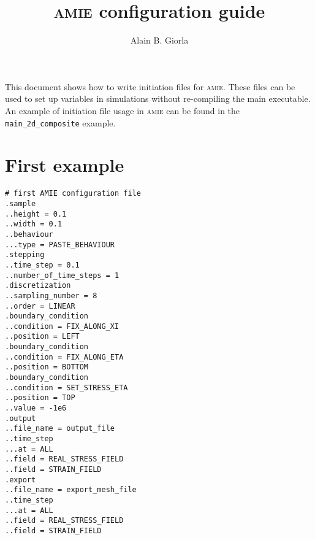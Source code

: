 \documentclass[10pt]{article}
\newcommand{\amie}{\textsc{amie}\xspace}
\begin{document}
\title{\amie configuration guide}
\author{Alain B. Giorla}

\maketitle

This document shows how to write initiation files for \amie. These files can be used to set up variables in simulations without re-compiling the main executable. An example of initiation file usage in \amie can be found in the \verb+main_2d_composite+ example.

\tableofcontents

\section{First example}

\verb+# first AMIE configuration file+\\
\verb+.sample+\\
\verb+..height = 0.1+\\
\verb+..width = 0.1+\\
\verb+..behaviour+\\
\verb+...type = PASTE_BEHAVIOUR+\\
\verb+.stepping+\\
\verb+..time_step = 0.1+\\
\verb+..number_of_time_steps = 1+\\
\verb+.discretization+\\
\verb+..sampling_number = 8+\\
\verb+..order = LINEAR+\\
\verb+.boundary_condition+\\
\verb+..condition = FIX_ALONG_XI+\\
\verb+..position = LEFT+\\
\verb+.boundary_condition+\\
\verb+..condition = FIX_ALONG_ETA+\\
\verb+..position = BOTTOM+\\
\verb+.boundary_condition+\\
\verb+..condition = SET_STRESS_ETA+\\
\verb+..position = TOP+\\
\verb+..value = -1e6+\\
\verb+.output+\\
\verb+..file_name = output_file+\\
\verb+..time_step+\\
\verb+...at = ALL+\\
\verb+..field = REAL_STRESS_FIELD+\\
\verb+..field = STRAIN_FIELD+\\
\verb+.export+\\
\verb+..file_name = export_mesh_file+\\
\verb+..time_step+\\
\verb+...at = ALL+\\
\verb+..field = REAL_STRESS_FIELD+\\
\verb+..field = STRAIN_FIELD+\\
\end{document}
